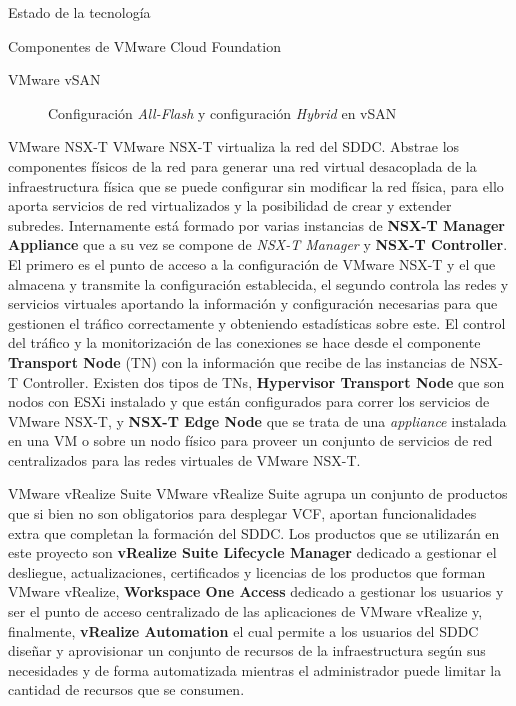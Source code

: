\begin{section}{Estado de la tecnología}
\begin{subsection}{Componentes de VMware Cloud Foundation \cite{componentesCloudFound}}
\begin{subsubsection}{VMware vSAN}
\begin{figure}[h!]
        \caption{Configuración \textit{All-Flash} y configuración \textit{Hybrid} en vSAN}
        \label{fig:performance-Hybrid-AllFlash-vSAN}
    \end{figure}
    \FloatBarrier
\end{subsubsection}

\begin{subsubsection}{VMware NSX-T}
    VMware NSX-T virtualiza la red del SDDC. Abstrae los componentes físicos de la red para generar una red virtual desacoplada de la infraestructura física que se puede configurar sin modificar la red física, para ello aporta servicios de red virtualizados y la posibilidad de crear y extender subredes. Internamente está formado por varias instancias de \textbf{NSX-T Manager Appliance} que a su vez se compone de \textit{NSX-T Manager} y \textbf{NSX-T Controller}. El primero es el punto de acceso a la configuración de VMware NSX-T y el que almacena y transmite la configuración establecida, el segundo controla las redes y servicios virtuales aportando la información y configuración necesarias para que gestionen el tráfico correctamente y obteniendo estadísticas sobre este. El control del tráfico y la monitorización de las conexiones se hace desde el componente \textbf{Transport Node} (TN) con la información que recibe de las instancias de NSX-T Controller. Existen dos tipos de TNs, \textbf{Hypervisor Transport Node} que son nodos con ESXi instalado y que están configurados para correr los servicios de VMware NSX-T, y \textbf{NSX-T Edge Node} que se trata de una \textit{appliance} instalada en una VM o sobre un nodo físico para proveer un conjunto de servicios de red centralizados para las redes virtuales de VMware NSX-T.
\end{subsubsection}
\begin{subsubsection}{VMware vRealize Suite}
    VMware vRealize Suite agrupa un conjunto de productos que si bien no son obligatorios para desplegar VCF, aportan funcionalidades extra que completan la formación del SDDC. Los productos que se utilizarán en este proyecto son \textbf{vRealize Suite Lifecycle Manager} dedicado a gestionar el desliegue, actualizaciones, certificados y licencias de los productos que forman VMware vRealize, \textbf{Workspace One Access} dedicado a gestionar los usuarios y ser el punto de acceso centralizado de las aplicaciones de VMware vRealize y, finalmente, \textbf{vRealize Automation} el cual permite a los usuarios del SDDC diseñar y aprovisionar un conjunto de recursos de la infraestructura según sus necesidades y de forma automatizada mientras el administrador puede limitar la cantidad de recursos que se consumen.

\end{subsubsection}
\end{subsection}
\end{section}
